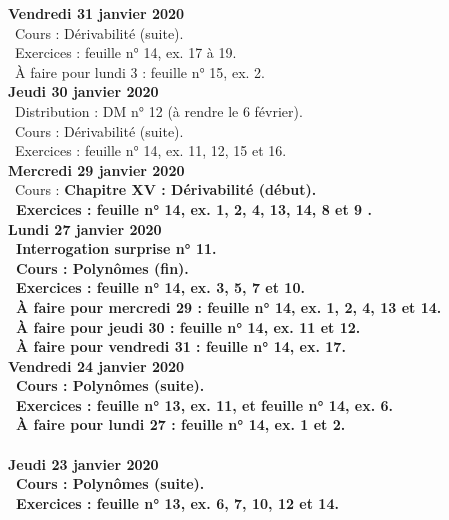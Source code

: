 \documentclass[12pt,a4paper]{article}
\begin{document}
\noindent\textbf{Vendredi 31 janvier 2020}\\
\bu\ Cours : Dérivabilité (suite).\\
\bu\ Exercices : feuille n° 14, ex. 17 à 19.\\
\bu\ À faire pour lundi 3 : feuille n° 15, ex. 2.\vspace{.4cm}\\
 
\noindent\textbf{Jeudi 30 janvier 2020}\\
\bu\ Distribution : DM n° 12 (à rendre le 6 février).\\
\bu\ Cours : Dérivabilité (suite).\\
\bu\ Exercices : feuille n° 14, ex. 11, 12, 15 et 16.\vspace{.4cm}\\
  
\noindent\textbf{Mercredi 29 janvier 2020} \\
\bu\ Cours : \bf Chapitre XV \rm : Dérivabilité (début).\\
\bu\ Exercices : feuille n° 14, ex. 1, 2, 4, 13, 14, 8 et 9 .\vspace{.4cm}\\
  
\noindent\textbf{Lundi 27 janvier 2020} \\
\bu\ Interrogation surprise n° 11.\\
\bu\ Cours : Polynômes (fin).\\
\bu\ Exercices : feuille n° 14, ex. 3, 5, 7 et 10.\\
\bu\ À faire pour mercredi 29 : feuille n° 14, ex. 1, 2, 4, 13 et 14.\\
\bu\ À faire pour jeudi 30 : feuille n° 14, ex. 11 et 12.\\
\bu\ À faire pour vendredi 31 : feuille n° 14, ex. 17.\vspace{.4cm}\\

\noindent\textbf{Vendredi 24 janvier 2020}\\
\bu\ Cours : Polynômes (suite).\\
\bu\ Exercices : feuille n° 13, ex. 11, et feuille n° 14, ex. 6.\\
\bu\ À faire pour lundi 27 : feuille n° 14, ex. 1 et 2.\vspace{.4cm}\\

\vspace{.4cm}\\

\noindent\textbf{Jeudi 23 janvier 2020}\\
\bu\ Cours : Polynômes (suite).\\
\bu\ Exercices : feuille n° 13, ex. 6, 7, 10, 12 et 14.\vspace{.4cm}\\
\end{document}
